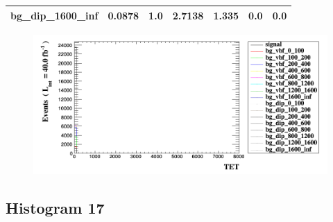 \documentclass[a4paper, 10pt]{article}
\begin{document}
\begin{table}[H]
\begin{center}
\begin{tabular}{|m{23.0mm}|m{23.0mm}|m{18.0mm}|m{19.0mm}|m{19.0mm}|m{19.0mm}|m{19.0mm}|}
      \hline
      {\cellcolor{white}         bg\_dip\_1600\_inf}& {\cellcolor{white}         0.0878}& {\cellcolor{white}         1.0}& {\cellcolor{white}         2.7138}& {\cellcolor{white}         1.335}& {\cellcolor{green}         0.0}& {\cellcolor{green}         0.0}\\
\hline
    \end{tabular}
  \end{center}
\end{table}

\begin{figure}[H]
  \begin{center}
    \includegraphics[scale=0.45]{selection_15.png}\\
\caption{   }
  \end{center}
\end{figure}
      \newpage
\subsection{ Histogram 17}
\end{document}
